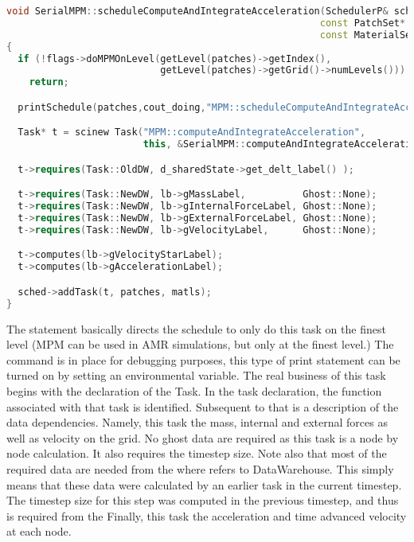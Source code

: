 \begin{lstlisting}[language=Cpp]
void SerialMPM::scheduleComputeAndIntegrateAcceleration(SchedulerP& sched,
                                                       const PatchSet* patches,
                                                       const MaterialSet* matls)
{
  if (!flags->doMPMOnLevel(getLevel(patches)->getIndex(),
                           getLevel(patches)->getGrid()->numLevels()))
    return;

  printSchedule(patches,cout_doing,"MPM::scheduleComputeAndIntegrateAcceleration\t\t\t\t");

  Task* t = scinew Task("MPM::computeAndIntegrateAcceleration",
                        this, &SerialMPM::computeAndIntegrateAcceleration);

  t->requires(Task::OldDW, d_sharedState->get_delt_label() );

  t->requires(Task::NewDW, lb->gMassLabel,          Ghost::None);
  t->requires(Task::NewDW, lb->gInternalForceLabel, Ghost::None);
  t->requires(Task::NewDW, lb->gExternalForceLabel, Ghost::None);
  t->requires(Task::NewDW, lb->gVelocityLabel,      Ghost::None);

  t->computes(lb->gVelocityStarLabel);
  t->computes(lb->gAccelerationLabel);

  sched->addTask(t, patches, matls);
}
\end{lstlisting}

The  statement basically directs the schedule to only do this task on the 
finest level (MPM can be used in AMR simulations, but only at the finest
level.)  The  command is in place for debugging purposes,
this type of print statement can be turned on by setting an environmental
variable.  The real business of this task begins with the declaration of the
Task.  In the task declaration, the function associated with that task is
identified.  Subsequent to that is a description of the data dependencies.
Namely, this task  the mass, internal and external forces as well
as velocity on the grid.  No ghost data are required as this task is a 
node by node calculation.  It also requires the timestep size.  Note also
that most of the required data are needed from the  where
 refers to
DataWarehouse.  This simply means that these data were calculated by an
earlier task in the current timestep.  The timestep size for this step
was computed in the previous timestep, and thus is required from the 
Finally, this task  the acceleration and time advanced velocity
at each node.

